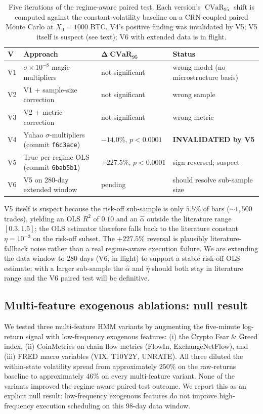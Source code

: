 \documentclass[11pt,letterpaper]{article}
\newcommand{\CVaR}{\operatorname{CVaR}}
\begin{document}
\begin{table}[!htb]
\centering
\caption{Five iterations of the regime-aware paired test. Each version's \(\CVaR_{95}\) shift is computed against the constant-volatility baseline on a CRN-coupled paired Monte Carlo at \(X_0=1000\) BTC. V4's positive finding was invalidated by V5; V5 itself is suspect (see text); V6 with extended data is in flight.}
\label{tab:regime}
\small
\begin{tabular}{l l l l}
\toprule
\textbf{V} & \textbf{Approach} & \(\bm{\Delta\CVaR_{95}}\) & \textbf{Status} \\
\midrule
V1 & \(\sigma\!\times\!10^{-8}\) magic multipliers & not significant & wrong model (no microstructure basis) \\
V2 & V1 + sample-size correction & not significant & wrong sample \\
V3 & V2 + metric correction & not significant & wrong metric \\
V4 & Yuhao \(\sigma\)-multipliers (commit \texttt{f6c3ace}) & \(\bm{-14.0\%},\, p<0.0001\) & \textbf{INVALIDATED by V5} \\
V5 & True per-regime OLS (commit \texttt{6bab5b1}) & \(+227.5\%,\, p<0.0001\) & sign reversed; suspect \\
V6 & V5 on 280-day extended window & pending & should resolve sub-sample size \\
\bottomrule
\end{tabular}
\end{table}

V5 itself is suspect because the risk-off sub-sample is only \(5.5\%\) of bars (\(\sim 1{,}500\) trades), yielding an OLS \(R^{2}\) of \(0.10\) and an \(\hat\alpha\) outside the literature range \([0.3, 1.5]\); the OLS estimator therefore falls back to the literature constant \(\eta=10^{-3}\) on the risk-off subset. The \(+227.5\%\) reversal is plausibly literature-fallback noise rather than a real regime-aware execution failure. We are extending the data window to 280 days (V6, in flight) to support a stable risk-off OLS estimate; with a larger sub-sample the \(\hat\alpha\) and \(\hat\eta\) should both stay in literature range and the V6 paired test will be definitive.

\subsection{Multi-feature exogenous ablations: null result}

We tested three multi-feature HMM variants by augmenting the five-minute log-return signal with low-frequency exogenous features: (i) the Crypto Fear \& Greed index, (ii) CoinMetrics on-chain flow metrics (FlowIn, ExchangeNetFlow), and (iii) FRED macro variables (VIX, T10Y2Y, UNRATE). All three diluted the within-state volatility spread from approximately \(250\%\) on the raw-returns baseline to approximately \(46\%\) on every multi-feature variant. None of the variants improved the regime-aware paired-test outcome. We report this as an explicit null result: low-frequency exogenous features do not improve high-frequency execution scheduling on this 98-day data window.
\end{document}
